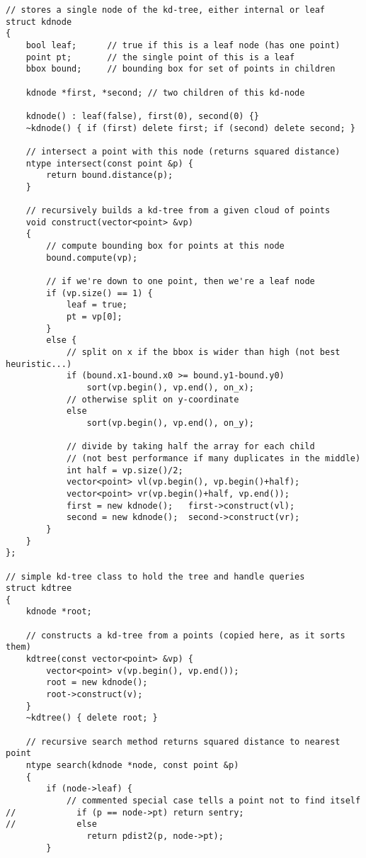 \begin{lstlisting}
// stores a single node of the kd-tree, either internal or leaf
struct kdnode 
{
    bool leaf;      // true if this is a leaf node (has one point)
    point pt;       // the single point of this is a leaf
    bbox bound;     // bounding box for set of points in children
    
    kdnode *first, *second; // two children of this kd-node
    
    kdnode() : leaf(false), first(0), second(0) {}
    ~kdnode() { if (first) delete first; if (second) delete second; }
    
    // intersect a point with this node (returns squared distance)
    ntype intersect(const point &p) {
        return bound.distance(p);
    }
    
    // recursively builds a kd-tree from a given cloud of points
    void construct(vector<point> &vp)
    {
        // compute bounding box for points at this node
        bound.compute(vp);
        
        // if we're down to one point, then we're a leaf node
        if (vp.size() == 1) {
            leaf = true;
            pt = vp[0];
        }
        else {
            // split on x if the bbox is wider than high (not best heuristic...)
            if (bound.x1-bound.x0 >= bound.y1-bound.y0)
                sort(vp.begin(), vp.end(), on_x);
            // otherwise split on y-coordinate
            else
                sort(vp.begin(), vp.end(), on_y);
            
            // divide by taking half the array for each child
            // (not best performance if many duplicates in the middle)
            int half = vp.size()/2;
            vector<point> vl(vp.begin(), vp.begin()+half);
            vector<point> vr(vp.begin()+half, vp.end());
            first = new kdnode();   first->construct(vl);
            second = new kdnode();  second->construct(vr);            
        }
    }
};

// simple kd-tree class to hold the tree and handle queries
struct kdtree
{
    kdnode *root;
    
    // constructs a kd-tree from a points (copied here, as it sorts them)
    kdtree(const vector<point> &vp) {
        vector<point> v(vp.begin(), vp.end());
        root = new kdnode();
        root->construct(v);
    }
    ~kdtree() { delete root; }
    
    // recursive search method returns squared distance to nearest point
    ntype search(kdnode *node, const point &p)
    {
        if (node->leaf) {
            // commented special case tells a point not to find itself
//            if (p == node->pt) return sentry;
//            else               
                return pdist2(p, node->pt);
        }
        

\end{lstlisting}

